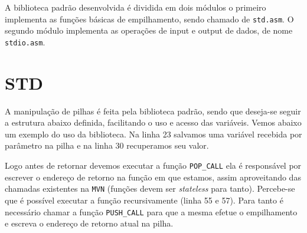 
A biblioteca padrão desenvolvida é dividida em dois módulos o primeiro
implementa as funções básicas de empilhamento, sendo chamado de \verb!std.asm!.
O segundo módulo implementa as operações de input e output de dados, de nome 
\verb!stdio.asm!.

\section{STD}

A manipulação de pilhas é feita pela biblioteca padrão, sendo que deseja-se
seguir a estrutura abaixo definida, facilitando o uso e acesso das variáveis.
Vemos abaixo um exemplo do uso da biblioteca. Na linha 23 salvamos uma variável
recebida por parâmetro na pilha e na linha 30 recuperamos seu valor. 

Logo antes de retornar devemos executar a função \verb!POP_CALL! 
ela é responsável por
escrever o endereço de retorno na função em que estamos, assim aproveitando das
chamadas existentes na \verb!MVN! (funções devem ser \emph{stateless} para tanto). Percebe-se
que é possível executar a função recursivamente (linha 55 e 57). Para tanto é
necessário chamar a função \verb!PUSH_CALL! para que a mesma efetue o
empilhamento e escreva o endereço de retorno atual na pilha. 

